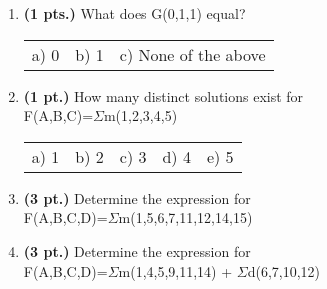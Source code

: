 \documentclass{article}
\begin{document}
\begin{enumerate}
\item {\bf (1 pts.)} What does G(0,1,1) equal?

\begin{tabular}{p{0.7in} p{0.7in} l}
a) 0 & b) 1 & c) None of the above
\end{tabular}

\item {\bf (1 pt.)} How many distinct \SOPmin solutions  exist for \\
F(A,B,C)=$\Sigma$m(1,2,3,4,5)

\begin{tabular}{p{0.7in} p{0.7in} p{0.7in} p{0.7in} l}
a) 1 & b) 2 & c) 3 & d) 4 & e) 5
\end{tabular}


\item {\bf (3 pt.)} Determine the \SOPmin expression for \\
F(A,B,C,D)=$\Sigma$m(1,5,6,7,11,12,14,15)


\item {\bf (3 pt.)} Determine the \SOPmin expression for \\
F(A,B,C,D)=$\Sigma$m(1,4,5,9,11,14) + $\Sigma$d(6,7,10,12)



\end{enumerate}
\end{document}
